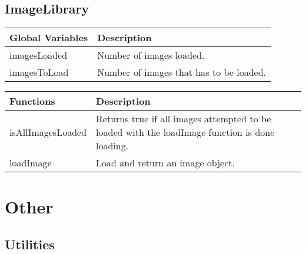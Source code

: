 \subsection*{ImageLibrary}
	
	\begin{table}[H]
	\begin{tabular}{p{4cm} | p{8cm} }
	\hline
	\rowcolor{gray}
	Global Variables & Description \\ \hline
	imagesLoaded & Number of images loaded. \\ \hline
	imagesToLoad & Number of images that has to be loaded. \\ \hline
	\end{tabular}
	\end{table}

	\begin{table}[H]
	\begin{tabular}{p{4cm} | p{8cm} }
	\hline
	\rowcolor{gray}
	Functions & Description \\ \hline
	isAllImagesLoaded & Returns true if all images attempted to be loaded with the loadImage function is done loading. \\ \hline	
	loadImage & Load and return an image object. \\ \hline	
	\end{tabular}
	\end{table}

\clearpage

\section{Other}

\subsection*{Utilities}

